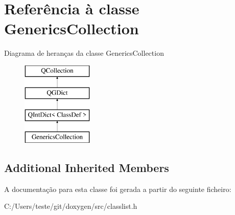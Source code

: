 \hypertarget{class_generics_collection}{\section{Referência à classe Generics\-Collection}
\label{class_generics_collection}
}
Diagrama de heranças da classe Generics\-Collection\begin{figure}[H]
\begin{center}
\leavevmode
\includegraphics[height=4.000000cm]{class_generics_collection}
\end{center}
\end{figure}
\subsection*{Additional Inherited Members}


A documentação para esta classe foi gerada a partir do seguinte ficheiro\-:\begin{DoxyCompactItemize}
\item 
C\-:/\-Users/teste/git/doxygen/src/classlist.\-h\end{DoxyCompactItemize}
